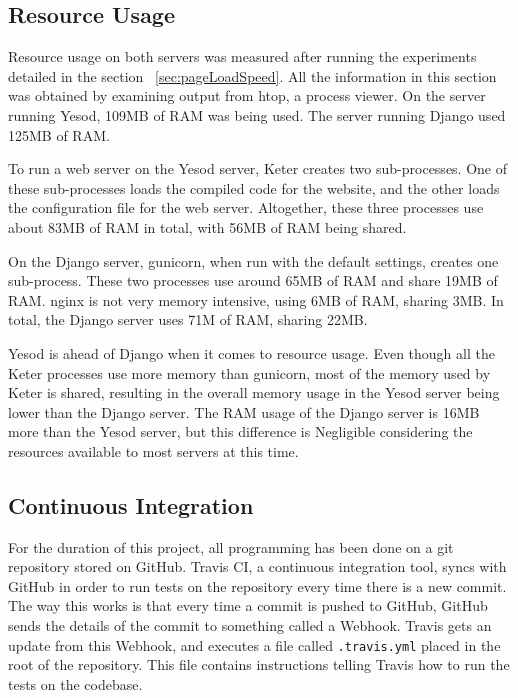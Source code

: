 \subsection{Resource Usage}

Resource usage on both servers was measured after running the experiments
detailed in the section ~\ref{sec:pageLoadSpeed}. All the information in 
this section was obtained by examining output from htop, a process viewer. 
On the server running Yesod, 109MB of RAM was being used. The server running 
Django used 125MB of RAM.

To run a web server on the Yesod server, Keter creates two sub-processes.
One of these sub-processes loads the compiled code for the website, and the
other loads the configuration file for the web server. Altogether, these
three processes use about 83MB of RAM in total, with 56MB of RAM being
shared.

On the Django server, gunicorn, when run with the default settings, creates
one sub-process. These two processes use around 65MB of RAM and share 19MB
of RAM. nginx is not very memory intensive, using 6MB of RAM, sharing 3MB.
In total, the Django server uses 71M of RAM, sharing 22MB.

Yesod is ahead of Django when it comes to resource usage. Even though all the
Keter processes use more memory than gunicorn, most of the memory used by Keter
is shared, resulting in the overall memory usage in the Yesod server being lower
than the Django server. The RAM usage of the Django server is 16MB more than
the Yesod server, but this difference is Negligible considering the resources
available to most servers at this time.

\subsection{Continuous Integration}

For the duration of this project, all programming has been done on a git
repository stored on GitHub. Travis CI, a continuous integration tool,
syncs with GitHub in order to run tests on the repository every time
there is a new commit. The way this works is that every time a commit
is pushed to GitHub, GitHub sends the details of the commit to something
called a Webhook. Travis gets an update from this Webhook, and executes
a file called \texttt{.travis.yml} placed in the root of the repository.
This file contains instructions telling Travis how to run the tests
on the codebase.

